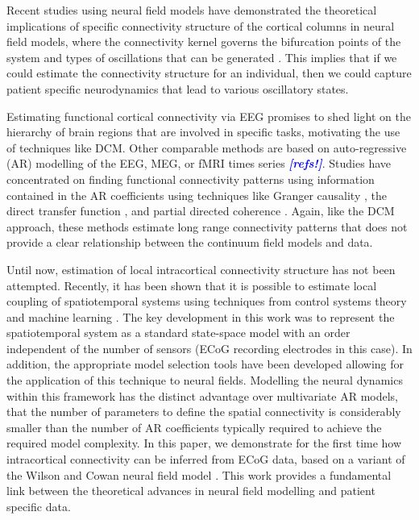 \documentclass[12pt]{iopart}
\newcommand{\todo}[1]{\textsf{\emph{\textbf{\textcolor{blue}{#1}}}}}
\begin{document}
Recent studies using neural field models have demonstrated the theoretical implications of specific connectivity structure of the cortical columns in neural field models, where the connectivity kernel governs the bifurcation points of the system \cite{Hutt2005} and types of oscillations that can be generated \cite{Schmidt2009}. This implies that if we could estimate the connectivity structure for an individual, then we could capture patient specific neurodynamics that lead to various oscillatory states. 

Estimating functional cortical connectivity via EEG promises to shed light on the hierarchy of brain regions that are involved in specific tasks, motivating the use of techniques like DCM. Other comparable methods are based on auto-regressive (AR) modelling of the EEG, MEG, or fMRI times series \todo{[refs!]}. Studies have concentrated on finding functional connectivity patterns using information contained in the AR coefficients using techniques like Granger causality \cite{Hesse2003}, the direct transfer function \cite{Kaminski1991}, and partial directed coherence \cite{Sameshima1999}. Again, like the DCM approach, these methods estimate long range connectivity patterns that does not provide a clear relationship between the continuum field models and data.

Until now, estimation of local intracortical connectivity structure has not been attempted. Recently, it has been shown that it is possible to estimate local coupling of spatiotemporal systems using techniques from control systems theory and machine learning \cite{Dewar2009}. The key development in this work was to represent the spatiotemporal system as a standard state-space model with an order independent of the number of sensors (ECoG recording electrodes in this case). In addition, the appropriate model selection tools have been developed \cite{Scerri2009} allowing for the application of this technique to neural fields. Modelling the neural dynamics within this framework has the distinct advantage over multivariate AR models, that the number of parameters to define the spatial connectivity is considerably smaller than the number of AR coefficients typically required to achieve the required model complexity. In this paper, we demonstrate for the first time how intracortical connectivity can be inferred from ECoG data, based on a variant of the Wilson and Cowan neural field model \cite{Wilson1973}. This work provides a fundamental link between the theoretical advances in neural field modelling and patient specific data.
\end{document}
